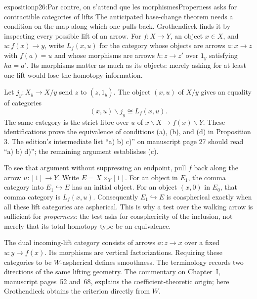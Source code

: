 \begin{dcomment}{exposition}{p26:Par contre, on s'attend que les morphismes}{Properness asks for contractible categories of lifts}
The anticipated base-change theorem needs a condition on the map along which one pulls back. Grothendieck finds it by inspecting every possible lift of an arrow. For $f:X\to Y$, an object $x\in X$, and $u:f(x)\to y$, write $L_f(x,u)$ for the category whose objects are arrows $a:x\to z$ with $f(a)=u$ and whose morphisms are arrows $h:z\to z'$ over $1_y$ satisfying $ha=a'$. Its morphisms matter as much as its objects: merely asking for at least one lift would lose the homotopy information.

Let $j_y:X_y\to X/y$ send $z$ to $(z,1_y)$. The object $(x,u)$ of $X/y$ gives an equality of categories
\[
 (x,u)\backslash j_y\cong L_f(x,u).
\]
The same category is the strict fibre over $u$ of $x\backslash X\to f(x)\backslash Y$. These identifications prove the equivalence of conditions (a), (b), and (d) in Proposition 3. The edition's intermediate list ``a) b) c)'' on manuscript page 27 should read ``a) b) d)''; the remaining argument establishes (c).

To see that argument without suppressing an endpoint, pull $f$ back along the arrow $u:[1]\to Y$. Write $E=X\times_Y[1]$. For an object in $E_1$, the comma category into $E_1\hookrightarrow E$ has an initial object. For an object $(x,0)$ in $E_0$, that comma category is $L_f(x,u)$. Consequently $E_1\hookrightarrow E$ is coaspherical exactly when all these lift categories are aspherical. This is why a test over the walking arrow is sufficient for \emph{properness}: the test asks for coasphericity of the inclusion, not merely that its total homotopy type be an equivalence.

The dual incoming-lift category consists of arrows $a:z\to x$ over a fixed $u:y\to f(x)$. Its morphisms are vertical factorizations. Requiring these categories to be $W$-aspherical defines smoothness. The terminology records two directions of the same lifting geometry. The commentary on Chapter~I, manuscript pages~52 and~68, explains the coefficient-theoretic origin; here Grothendieck obtains the criterion directly from $W$.
\end{dcomment}

